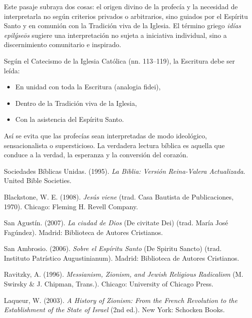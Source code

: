 \documentclass[12pt]{article}
\begin{document}
Este pasaje subraya dos cosas: el origen divino de la profecía y la necesidad de interpretarla no según criterios privados o arbitrarios, sino guiados por el Espíritu Santo y en comunión con la Tradición viva de la Iglesia. El término griego \emph{idías epilýseōs} sugiere una interpretación no sujeta a iniciativa individual, sino a discernimiento comunitario e inspirado.

Según el Catecismo de la Iglesia Católica (nn. 113–119), la Escritura debe ser leída:

\begin{itemize}
  \item En unidad con toda la Escritura (analogia fidei),
  \item Dentro de la Tradición viva de la Iglesia,
  \item Con la asistencia del Espíritu Santo.
\end{itemize}

Así se evita que las profecías sean interpretadas de modo ideológico, sensacionalista o supersticioso. La verdadera lectura bíblica es aquella que conduce a la verdad, la esperanza y la conversión del corazón.

\begin{thebibliography}{9}

Sociedades Bíblicas Unidas. (1995). \textit{La Biblia: Versión Reina-Valera Actualizada}. United Bible Societies.

Blackstone, W. E. (1908). \textit{Jesús viene} (trad. Casa Bautista de Publicaciones, 1970). Chicago: Fleming H. Revell Company.

San Agustín. (2007). \textit{La ciudad de Dios} (De civitate Dei) (trad. María José Fagúndez). Madrid: Biblioteca de Autores Cristianos.

San Ambrosio. (2006). \textit{Sobre el Espíritu Santo} (De Spiritu Sancto) (trad. Instituto Patrístico Augustinianum). Madrid: Biblioteca de Autores Cristianos.

Ravitzky, A. (1996). \textit{Messianism, Zionism, and Jewish Religious Radicalism} (M. Swirsky \& J. Chipman, Trans.). Chicago: University of Chicago Press.

Laqueur, W. (2003). \textit{A History of Zionism: From the French Revolution to the Establishment of the State of Israel} (2nd ed.). New York: Schocken Books.


\end{thebibliography}
\end{document}
